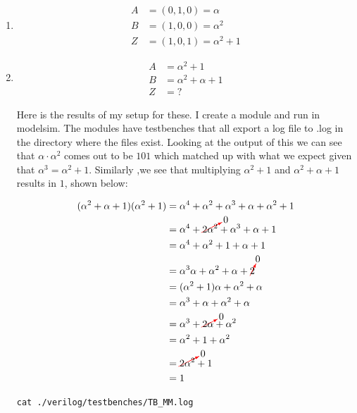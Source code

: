 \documentclass[a4paper,11pt]{exam}
\begin{document}
\begin{enumerate}
\item 
\label{sec:org79f2f42}
\begin{align*}
 A &= (0, 1, 0) = \alpha \\
 B &= (1, 0, 0) = \alpha^2\\
 Z &= (1, 0, 1) = \alpha^2 + 1
\end{align*}
\item 
\label{sec:org3b15e74}

\begin{align*}
A &= \alpha^2 + 1\\
B &= \alpha^2 + \alpha + 1
\\Z &= ?
\end{align*}

\noindent
Here is the results of my setup for these. I create a module and run in modelsim. The modules have testbenches that all export a log file to .log in the directory where the files exist. Looking at the output of this we can see that \(\alpha\cdot \alpha^2\) comes out to be \(101\) which matched up with what we expect given that \(\alpha^3 = \alpha^2 + 1\). Similarly ,we see that multiplying \(\alpha^2 + 1\) and \(\alpha^2 + \alpha + 1\) results in \(1\), shown below:

\begin{align*}
(\alpha^2 + \alpha + 1)(\alpha^2 + 1) &= \alpha^4 + \alpha^2 + \alpha^3 + \alpha + \alpha^2 + 1\\
&= \alpha^4 + \textcolor{red}{\cancelto{\textcolor{black}{0}}{\textcolor{black}{2\alpha^2}}} + \alpha^3 + \alpha + 1 \\
&= \alpha^4 + \alpha^2 + 1 + \alpha + 1 \\
&= \alpha^3\alpha + \alpha^2 + \alpha + \textcolor{red}{\cancelto{\textcolor{black}{0}}{\textcolor{black}{2}}}\\
&= (\alpha^2 + 1)\alpha + \alpha^2 + \alpha\\
&= \alpha^3 + \alpha + \alpha^2 + \alpha\\
&= \alpha^3 + \textcolor{red}{\cancelto{\textcolor{black}{0}}{\textcolor{black}{2\alpha}}} + \alpha^2 \\
&=  \alpha^2 + 1 + \alpha^2 \\
&= \textcolor{red}{\cancelto{\textcolor{black}{0}}{\textcolor{black}{2\alpha^2}}} + 1\\
&= 1
\end{align*}




\begin{verbatim}
cat ./verilog/testbenches/TB_MM.log
\end{verbatim}



\end{enumerate}
\end{document}
